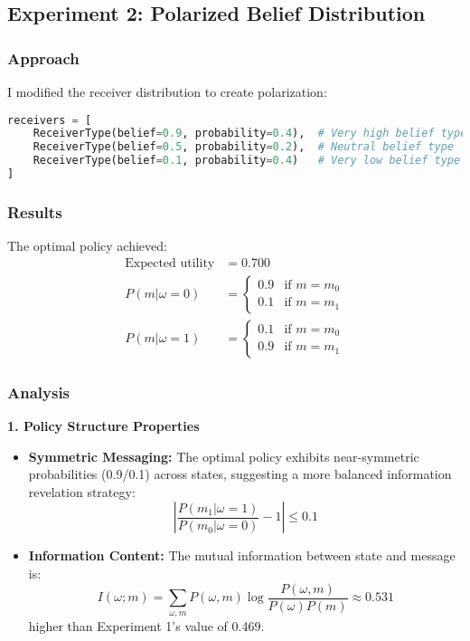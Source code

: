 \documentclass[12pt]{article}
\begin{document}
\subsection{Experiment 2: Polarized Belief Distribution}

\subsubsection{Approach}
I modified the receiver distribution to create polarization:

\begin{lstlisting}[language=Python, caption=Experiment 2 Setup]
receivers = [
    ReceiverType(belief=0.9, probability=0.4),  # Very high belief type
    ReceiverType(belief=0.5, probability=0.2),  # Neutral belief type
    ReceiverType(belief=0.1, probability=0.4)   # Very low belief type
]
\end{lstlisting}

\subsubsection{Results}
The optimal policy achieved:
\begin{align*}
    \text{Expected utility} &= 0.700 \\
    P(m|\omega=0) &= \begin{cases}
        0.9 & \text{if } m = m_0 \\
        0.1 & \text{if } m = m_1
    \end{cases} \\
    P(m|\omega=1) &= \begin{cases}
        0.1 & \text{if } m = m_0 \\
        0.9 & \text{if } m = m_1
    \end{cases}
\end{align*}

\subsubsection{Analysis}
\textbf{1. Policy Structure Properties}
\begin{itemize}
    \item \textbf{Symmetric Messaging:} The optimal policy exhibits near-symmetric probabilities (0.9/0.1) across states, suggesting a more balanced information revelation strategy:
    \begin{equation}
        \left|\frac{P(m_1|\omega=1)}{P(m_0|\omega=0)} - 1\right| \leq 0.1
    \end{equation}
    
    \item \textbf{Information Content:} The mutual information between state and message is:
    \begin{equation}
        I(\omega;m) = \sum_{\omega,m} P(\omega,m)\log\frac{P(\omega,m)}{P(\omega)P(m)}
        \approx 0.531
    \end{equation}
    higher than Experiment 1's value of 0.469.
\end{itemize}
\end{document}
